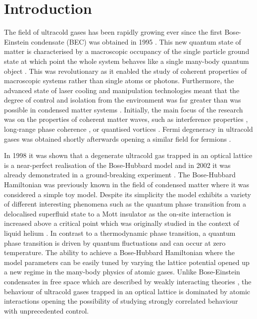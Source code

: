 
\chapter{Introduction}  %

\ifpdf
    \graphicspath{{Chapter1/Figs/Raster/}{Chapter1/Figs/PDF/}{Chapter1/Figs/}}
\else
    \graphicspath{{Chapter1/Figs/Vector/}{Chapter1/Figs/}}
\fi


The field of ultracold gases has been rapidly growing ever since the
first Bose-Einstein condensate (BEC) was obtained in 1995
\cite{anderson1995, bradley1995, davis1995}. This new quantum state of
matter is characterised by a macroscopic occupancy of the single
particle ground state at which point the whole system behaves like a
single many-body quantum object \cite{PitaevskiiStringari}. This was
revolutionary as it enabled the study of coherent properties of
macroscopic systems rather than single atoms or photons. Furthermore,
the advanced state of laser cooling and manipulation technologies
meant that the degree of control and isolation from the environment
was far greater than was possible in condensed matter systems
\cite{lewenstein2007, bloch2008}. Initially, the main focus of the
research was on the properties of coherent matter waves, such as
interference properties \cite{andrews1997}, long-range phase coherence
\cite{bloch2000}, or quantised vortices \cite{matthews1999,
  madison2000, abo2001}. Fermi degeneracy in ultracold gases was
obtained shortly afterwards opening a similar field for fermions
\cite{demarco1999, schreck2001, truscott2001}.

In 1998 it was shown that a degenerate ultracold gas trapped in an
optical lattice is a near-perfect realisation of the Bose-Hubbard
model \cite{jaksch1998} and in 2002 it was already demonstrated in a
ground-breaking experiment \cite{greiner2002}. The Bose-Hubbard
Hamiltonian was previously known in the field of condensed matter
where it was considered a simple toy model. Despite its simplicity the
model exhibits a variety of different interesting phenomena such as
the quantum phase transition from a delocalised superfluid state to a
Mott insulator as the on-site interaction is increased above a
critical point which was originally studied in the context of liquid
helium \cite{fisher1989}. In contrast to a thermodynamic phase
transition, a quantum phase transition is driven by quantum
fluctuations and can occur at zero temperature. The ability to achieve
a Bose-Hubbard Hamiltonian where the model parameters can be easily
tuned by varying the lattice potential opened up a new regime in the
many-body physics of atomic gases. Unlike Bose-Einstein condensates in
free space which are described by weakly interacting theories
\cite{dalfovo1999}, the behaviour of ultracold gases trapped in an
optical lattice is dominated by atomic interactions opening the
possibility of studying strongly correlated behaviour with
unprecedented control.

